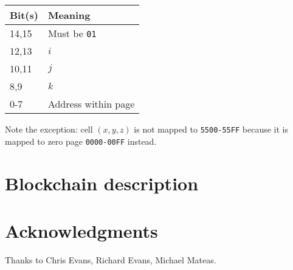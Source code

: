 \documentclass{article}
\begin{document}
\begin{tabular}{ll}
  \hline
  Bit(s) & Meaning \\
  \hline
  14,15 & Must be {\tt 01} \\
  12,13 & $i$ \\
  10,11 & $j$ \\
  8,9 & $k$ \\
  0-7 & Address within page \\
  \hline
\end{tabular}

Note the exception: cell $(x,y,z)$ is not mapped to {\tt 5500-55FF}
because it is mapped to zero page {\tt 0000-00FF} instead.




\section{Blockchain description}

\cite{Nakamoto2008}

\section*{Acknowledgments}
Thanks to Chris Evans, Richard Evans, Michael Mateas.



\end{document}
